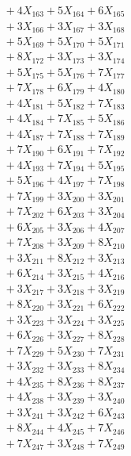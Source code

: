 \documentclass[a4paper,10pt]{article}
\begin{document}
{\begin{align}
&\;  + 4 X_{163} + 5 X_{164} + 6 X_{165} \\[0.3ex]
&\;  + 3 X_{166} + 3 X_{167} + 3 X_{168} \\[0.3ex]
&\;  + 5 X_{169} + 5 X_{170} + 5 X_{171} \\[0.3ex]
&\;  + 8 X_{172} + 3 X_{173} + 3 X_{174} \\[0.3ex]
&\;  + 5 X_{175} + 5 X_{176} + 7 X_{177} \\[0.3ex]
&\;  + 7 X_{178} + 6 X_{179} + 4 X_{180} \\[0.3ex]
&\;  + 4 X_{181} + 5 X_{182} + 7 X_{183} \\[0.3ex]
&\;  + 4 X_{184} + 7 X_{185} + 5 X_{186} \\[0.3ex]
&\;  + 4 X_{187} + 7 X_{188} + 7 X_{189} \\[0.5ex]\allowbreak
&\;  + 7 X_{190} + 6 X_{191} + 7 X_{192} \\[0.3ex]
&\;  + 4 X_{193} + 7 X_{194} + 5 X_{195} \\[0.3ex]
&\;  + 5 X_{196} + 4 X_{197} + 7 X_{198} \\[0.3ex]
&\;  + 7 X_{199} + 3 X_{200} + 3 X_{201} \\[0.3ex]
&\;  + 7 X_{202} + 6 X_{203} + 3 X_{204} \\[0.3ex]
&\;  + 6 X_{205} + 3 X_{206} + 4 X_{207} \\[0.3ex]
&\;  + 7 X_{208} + 3 X_{209} + 8 X_{210} \\[0.3ex]
&\;  + 3 X_{211} + 8 X_{212} + 3 X_{213} \\[0.3ex]
&\;  + 6 X_{214} + 3 X_{215} + 4 X_{216} \\[0.3ex]
&\;  + 3 X_{217} + 3 X_{218} + 3 X_{219} \\[0.5ex]\allowbreak
&\;  + 8 X_{220} + 3 X_{221} + 6 X_{222} \\[0.3ex]
&\;  + 3 X_{223} + 3 X_{224} + 3 X_{225} \\[0.3ex]
&\;  + 6 X_{226} + 3 X_{227} + 8 X_{228} \\[0.3ex]
&\;  + 7 X_{229} + 5 X_{230} + 7 X_{231} \\[0.3ex]
&\;  + 3 X_{232} + 3 X_{233} + 8 X_{234} \\[0.3ex]
&\;  + 4 X_{235} + 8 X_{236} + 8 X_{237} \\[0.3ex]
&\;  + 4 X_{238} + 3 X_{239} + 3 X_{240} \\[0.3ex]
&\;  + 3 X_{241} + 3 X_{242} + 6 X_{243} \\[0.3ex]
&\;  + 8 X_{244} + 4 X_{245} + 7 X_{246} \\[0.3ex]
&\;  + 7 X_{247} + 3 X_{248} + 7 X_{249} \\[0.5ex]\allowbreak

\end{align}}
\end{document}
